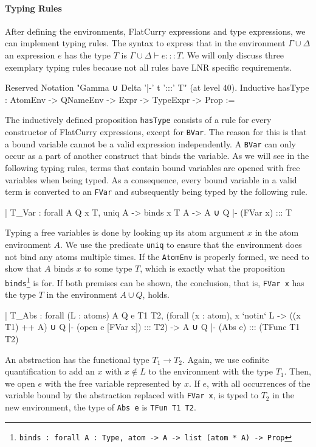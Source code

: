 \documentclass[a4paper, 11pt, fleqn]{scrreprt}
\newcommand{\coqinline}[1]{\texttt{#1}}
\begin{document}
	\paragraph{Typing Rules}
	After defining the environments, FlatCurry expressions and type expressions, we can implement typing rules. The syntax to express that in the environment $\Gamma \cup \Delta$ an expression $e$ has the type $T$ is $\Gamma \cup \Delta \vdash e ::: T$. We will only discuss three exemplary typing rules because not all rules have LNR specific requirements.
	\begin{coqcode}
Reserved Notation "Gamma ∪ Delta '|-' t ':::' T" (at level 40).
Inductive hasType : AtomEnv -> QNameEnv -> Expr -> TypeExpr -> Prop :=
	\end{coqcode}
	The inductively defined proposition \coqinline{hasType} consists of a rule for every constructor of FlatCurry expressions, except for \coqinline{BVar}. The reason for this is that a bound variable cannot be a valid expression independently. A \coqinline{BVar} can only occur as a part of another construct that binds the variable. As we will see in the following typing rules, terms that contain bound variables are opened with free variables when being typed. As a consequence, every bound variable in a valid term is converted to an \coqinline{FVar} and subsequently being typed by the following rule.
	
	\begin{coqcode}
| T_Var : forall A Q x T,
    uniq A ->
    binds x T A ->
    A ∪ Q |- (FVar x) ::: T
	\end{coqcode}
	\noindent
	Typing a free variables is done by looking up its atom argument $x$ in the atom environment $A$. We use the predicate \coqinline{uniq} to ensure that the environment does not bind any atoms multiple times. If the \coqinline{AtomEnv} is properly formed, we need to show that $A$ binds $x$ to some type $T$, which is exactly what the proposition \coqinline{binds}\footnote{\coqinline{binds : forall A : Type, atom -> A -> list (atom * A) -> Prop}} is for.
	If both premises can be shown, the conclusion, that is, \coqinline{FVar x} has the type $T$ in the environment $A \cup Q$, holds.

	\begin{coqcode}
| T_Abs : forall (L : atoms) A Q e T1 T2,
    (forall (x : atom), 
      x `notin` L ->
      ((x ~ T1) ++ A) ∪ Q |- (open e [FVar x]) ::: T2) ->
    A ∪ Q |- (Abs e) ::: (TFunc T1 T2)
	\end{coqcode}
	\noindent
	An abstraction has the functional type $T_1 \rightarrow T_2$. Again, we use cofinite quantification to add an $x$ with $x \notin L$ to the environment with the type $T_1$. Then, we open $e$ with the free variable represented by $x$. If $e$, with all occurrences of the variable bound by the abstraction replaced with \coqinline{FVar x}, is typed to $T_2$ in the new environment, the type of \coqinline{Abs e} is \coqinline{TFun T1 T2}.
    
\end{document}
